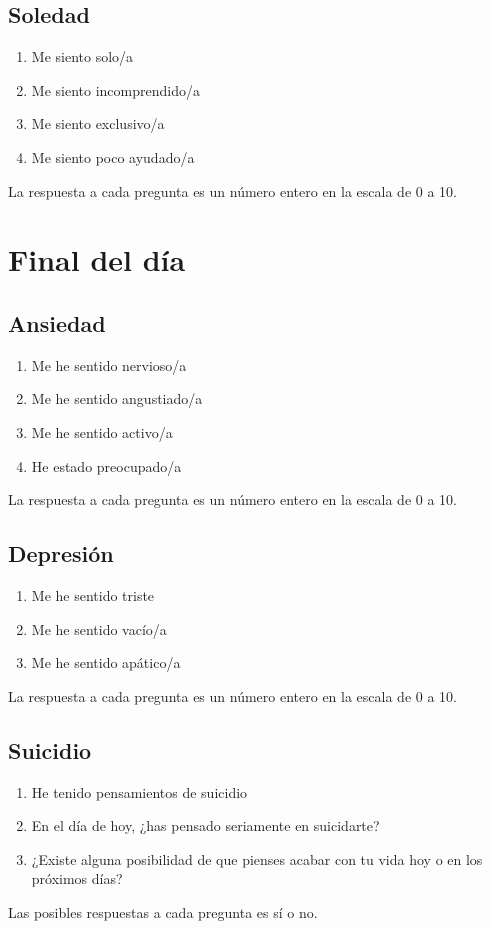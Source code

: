         \subsection{Soledad}
            \begin{enumerate}
                \item Me siento solo/a
                \item Me siento incomprendido/a
                \item Me siento exclusivo/a
                \item Me siento poco ayudado/a
            \end{enumerate}
            La respuesta a cada pregunta es un número entero en la escala de 0 a 10.

    \section{Final del día}
        \subsection{Ansiedad}
            \begin{enumerate}
                \item Me he sentido nervioso/a
                \item Me he sentido angustiado/a
                \item Me he sentido activo/a
                \item He estado preocupado/a
            \end{enumerate}
            La respuesta a cada pregunta es un número entero en la escala de 0 a 10.

        \subsection{Depresión}
            \begin{enumerate}
                \item Me he sentido triste
                \item Me he sentido vacío/a 
                \item Me he sentido apático/a
            \end{enumerate}
            La respuesta a cada pregunta es un número entero en la escala de 0 a 10.

        \subsection{Suicidio}
            \begin{enumerate}
                \item He tenido pensamientos de suicidio
                \item En el día de hoy, ¿has pensado seriamente en suicidarte?
                \item ¿Existe alguna posibilidad de que pienses acabar con tu vida hoy o en los próximos días?
            \end{enumerate}
            Las posibles respuestas a cada pregunta es sí o no.

